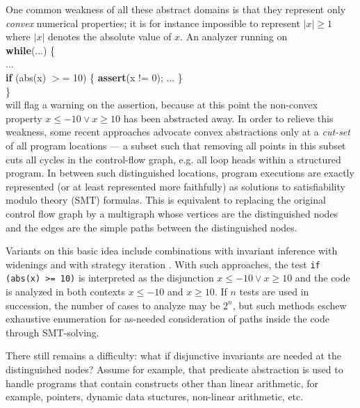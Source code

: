 \documentclass{llncs}
\newcommand{\pponly}[1]{}
\newcommand{\rronly}[1]{#1}
\begin{document}
\rronly{
One common weakness of all these abstract domains is that they
represent only \emph{convex} numerical properties; it is for instance
impossible to represent $|x| \geq 1$ where $|x|$ denotes the absolute
value of $x$. An analyzer running on \\[0.5ex]
{\footnotesize
\textbf{while}(...) \{\\
\hspace*{1em}... \\
\hspace*{1em}\textbf{if} (abs(x) $>$= 10) \{ \textbf{assert}(x != 0); ... \} \\
\} \\[0.5ex]
}
\noindent will flag a warning on the assertion, because at this point
the non-convex property $x \leq -10 \lor x \geq 10$ has been
abstracted away.  In order to relieve this weakness, some recent
approaches
\cite{Henry_Monniaux_Moy_SAS2012,Gawlitza_Monniaux_LMCS12,Monniaux_Gonnord_SAS11}
advocate convex abstractions only at a \emph{cut-set} of all program
locations --- a subset such that removing all points in this subset
cuts all cycles in the control-flow graph, e.g. all loop heads within
a structured program. In between such distinguished locations, program
executions are exactly represented (or at least represented more
faithfully) as solutions to satisfiability modulo theory (SMT)
formulas. This is equivalent to replacing the original control flow
graph by a multigraph whose vertices are the distinguished nodes and
the edges are the simple paths between the distinguished nodes.

Variants on this basic idea include combinations with invariant
inference with widenings
\cite{Monniaux_Gonnord_SAS11,Henry_Monniaux_Moy_SAS2012} and with
strategy iteration \cite{Gawlitza_Monniaux_LMCS12}. With such
approaches, the test \lstinline|if (abs(x) >= 10)| is interpreted as
the disjunction $x \leq -10 \lor x \geq 10$ and the code is analyzed
in both contexts $x \leq -10$ and $x \geq 10$. If $n$ tests are used
in succession, the number of cases to analyze may be $2^n$, but such
methods eschew exhaustive enumeration for as-needed consideration of
paths inside the code through SMT-solving.

There still remains a difficulty: what if disjunctive invariants are
needed at the distinguished nodes?  
Assume for example, that predicate abstraction is used to 
handle programs that contain
constructs other than linear arithmetic, for example,
pointers, dynamic data stuctures, non-linear arithmetic, etc.
}
\pponly{
In order to handle programs that contain
constructs other than linear arithmetic, for example,
pointers, dynamic data stuctures, non-linear arithmetic, etc,
one can split control nodes according to $n$ predicates, as in
\emph{predicate abstraction}. The number of control nodes may thus
grow exponentially in~$n$.
}
\end{document}
